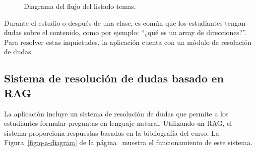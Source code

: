 \begin{figure}[h!]
  \centering
\caption{Diagrama del flujo del listado temas.}\label{fig:topics}
\end{figure}

Durante el estudio o después de una clase, es común que los estudiantes tengan dudas sobre el contenido, como por ejemplo: ``¿qué es un array de direcciones?''. Para resolver estas inquietudes, la aplicación cuenta con un módulo de resolución de dudas.

\subsection{Sistema de resolución de dudas basado en RAG}

La aplicación incluye un sistema de resolución de dudas que permite a los estudiantes formular preguntas en lenguaje natural. Utilizando un RAG, el sistema proporciona respuestas basadas en la bibliografía del curso. La Figura~\ref{fig:q-a-diagram} de la página~\pageref{fig:q-a-diagram} muestra el funcionamiento de este sistema.

